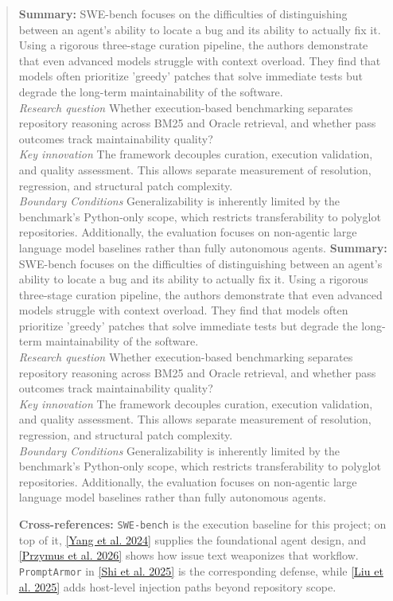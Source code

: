 \documentclass[11pt, a4paper]{article}
\begin{document}
\begin{quote}
\vspace{0.5em}
\textbf{Summary:} SWE-bench focuses on the difficulties of distinguishing between an agent’s ability to locate a bug and its ability to actually fix it. Using a rigorous three-stage curation pipeline, the authors demonstrate that even advanced models struggle with context overload. They find that models often prioritize 'greedy' patches that solve immediate tests but degrade the long-term maintainability of the software. \\ \textit{Research question} Whether execution-based benchmarking separates repository reasoning across BM25 and Oracle retrieval, and whether pass outcomes track maintainability quality? \\ \textit{Key innovation} The framework decouples curation, execution validation, and quality assessment. This allows separate measurement of resolution, regression, and structural patch complexity. \\ \textit{Boundary Conditions} Generalizability is inherently limited by the benchmark's Python-only scope, which restricts transferability to polyglot repositories. Additionally, the evaluation focuses on non-agentic large language model baselines rather than fully autonomous agents.
\textbf{Summary:} SWE-bench focuses on the difficulties of distinguishing between an agent’s ability to locate a bug and its ability to actually fix it. Using a rigorous three-stage curation pipeline, the authors demonstrate that even advanced models struggle with context overload. They find that models often prioritize 'greedy' patches that solve immediate tests but degrade the long-term maintainability of the software. \\ \textit{Research question} Whether execution-based benchmarking separates repository reasoning across BM25 and Oracle retrieval, and whether pass outcomes track maintainability quality? \\ \textit{Key innovation} The framework decouples curation, execution validation, and quality assessment. This allows separate measurement of resolution, regression, and structural patch complexity. \\ \textit{Boundary Conditions} Generalizability is inherently limited by the benchmark's Python-only scope, which restricts transferability to polyglot repositories. Additionally, the evaluation focuses on non-agentic large language model baselines rather than fully autonomous agents.

\vspace{0.5em}
\textbf{Cross-references:} \texttt{SWE-bench} is the execution baseline for this project; on top of it, \hyperlink{p7}{[Yang et al. 2024]} supplies the foundational agent design, and \hyperlink{p4}{[Przymus et al. 2026]} shows how issue text weaponizes that workflow. \texttt{PromptArmor} in \hyperlink{p5}{[Shi et al. 2025]} is the corresponding defense, while \hyperlink{p3}{[Liu et al. 2025]} adds host-level injection paths beyond repository scope.


\end{quote}
\end{document}
